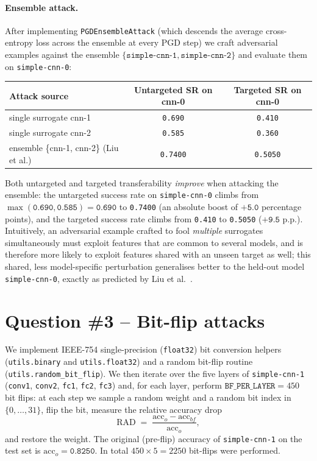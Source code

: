\documentclass[11pt]{article}
\begin{document}
\paragraph{Ensemble attack.}
After implementing \texttt{PGDEnsembleAttack} (which descends the average
cross-entropy loss across the ensemble at every PGD step) we craft
adversarial examples against the ensemble \(\{\texttt{simple-cnn-1},
\texttt{simple-cnn-2}\}\) and evaluate them on \texttt{simple-cnn-0}:
\begin{center}
\begin{tabular}{lcc}
\toprule
Attack source & Untargeted SR on cnn-0 & Targeted SR on cnn-0 \\
\midrule
single surrogate cnn-1                   & \texttt{0.690} & \texttt{0.410} \\
single surrogate cnn-2                   & \texttt{0.585} & \texttt{0.360} \\
ensemble \{cnn-1, cnn-2\} (Liu et al.)   & \texttt{0.7400} & \texttt{0.5050} \\
\bottomrule
\end{tabular}
\end{center}
Both untargeted and targeted transferability \emph{improve} when attacking
the ensemble: the untargeted success rate on \texttt{simple-cnn-0} climbs
from \(\max(\texttt{0.690},\texttt{0.585})=\texttt{0.690}\)
to \texttt{0.7400} (an absolute boost of
\(\texttt{+5.0}\) percentage points), and the targeted success
rate climbs from \texttt{0.410} to \texttt{0.5050}
(\(\texttt{+9.5}\) p.p.). Intuitively, an adversarial example
crafted to fool \emph{multiple} surrogates simultaneously must exploit
features that are common to several models, and is therefore more likely to
exploit features shared with an unseen target as well; this shared, less
model-specific perturbation generalises better to the held-out model
\texttt{simple-cnn-0}, exactly as predicted by Liu et al.~\cite{liu2017}.


\section*{Question \#3 -- Bit-flip attacks}

We implement IEEE-754 single-precision (\texttt{float32}) bit conversion
helpers (\texttt{utils.binary} and \texttt{utils.float32}) and a random
bit-flip routine (\texttt{utils.random\_bit\_flip}). We then iterate over
the five layers of \texttt{simple-cnn-1} (\texttt{conv1}, \texttt{conv2},
\texttt{fc1}, \texttt{fc2}, \texttt{fc3}) and, for each layer, perform
\(\texttt{BF\_PER\_LAYER}=450\) bit flips: at each step we sample a random
weight and a random bit index in \(\{0,\dots,31\}\), flip the bit, measure
the relative accuracy drop
\[
\mathrm{RAD} \;=\; \frac{\mathrm{acc}_{o}-\mathrm{acc}_{bf}}{\mathrm{acc}_{o}},
\]
and restore the weight. The original (pre-flip) accuracy of
\texttt{simple-cnn-1} on the test set is
\(\mathrm{acc}_o = \texttt{0.8250}\). In total \(450\times 5 = 2250\)
bit-flips were performed.
\end{document}
